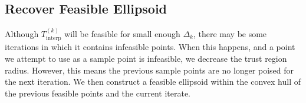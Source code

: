 \documentclass{article}
\newenvironment{comment}
  {\par\medskip
   \color{red}%
   \begin{framed}
   \textbf{Comment: }\ignorespaces}
 {\end{framed}
  \medskip}
\theoremstyle{case}
\numberwithin{theorem}{subsection}
\newcommand{\dk}{\Delta_k}
\newcommand{\mcik}{{{m}^{(k)}_{c_i}}}
\newcommand{\mfk}{{{m}_f}^{(k)}}
\newcommand{\reals}{\mathbb R}
\newcommand{\Rn}{\mathbb R^n}
\newcommand{\sampletrk}{{T_{\text{interp}}^{(k)}}}
\newcommand{\trsinfset}{{E_\textrm{infeasible}}}
\newcommand{\trstol}{{\delta_\textrm{infeasible}}}
\newcommand{\xk}{{x^{(k)}}}
\begin{document}
% 
% 
% 
% 
% 
% 



\subsection{Recover Feasible Ellipsoid}

Although $\sampletrk$ will be feasible for small enough $\dk$, there may be some iterations in which it contains infeasible points.
When this happens, and a point we attempt to use as a sample point is infeasible, we decrease the trust region radius.
However, this means the previous sample points are no longer poised for the next iteration.
We then construct a feasible ellipsoid within the convex hull of the previous feasible points and the current iterate.

%             
% 
\end{document}
